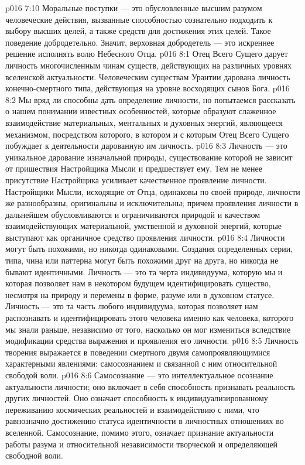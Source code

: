 \vs p016 7:10 Моральные поступки --- это обусловленные высшим разумом человеческие действия, вызванные способностью сознательно подходить к выбору высших целей, а также средств для достижения этих целей. Такое поведение добродетельно. Значит, верховная добродетель --- это искреннее решение исполнять волю Небесного Отца.
\vs p016 8:1 Отец Всего Сущего дарует личность многочисленным чинам существ, действующих на различных уровнях вселенской актуальности. Человеческим существам Урантии дарована личность конечно\hyp{}смертного типа, действующая на уровне восходящих сынов Бога.
\vs p016 8:2 Мы вряд ли способны дать определение личности, но попытаемся рассказать о нашем понимании известных особенностей, которые образуют слаженное взаимодействие материальных, ментальных и духовных энергий, являющееся механизмом, посредством которого, в котором и с которым Отец Всего Сущего побуждает к деятельности дарованную им личность.
\vs p016 8:3 Личность --- это уникальное дарование изначальной природы, существование которой не зависит от пришествия Настройщика Мысли и предшествует ему. Тем не менее присутствие Настройщика усиливает качественное проявление личности. Настройщики Мысли, исходящие от Отца, одинаковы по своей природе, личности же разнообразны, оригинальны и исключительны; причем проявления личности в дальнейшем обусловливаются и ограничиваются природой и качеством взаимодействующих материальной, умственной и духовной энергий, которые выступают как органичное средство проявления личности.
\vs p016 8:4 Личности могут быть похожими, но никогда одинаковыми. Создания определенных серии, типа, чина или паттерна могут быть похожими друг на друга, но никогда не бывают идентичными. Личность --- это та черта индивидуума, которую мы  и которая позволяет нам в некотором будущем идентифицировать существо, несмотря на природу и перемены в форме, разуме или в духовном статусе. Личность --- это та часть любого индивидуума, которая позволяет нам распознавать и идентифицировать этого человека именно как человека, которого мы знали раньше, независимо от того, насколько он мог измениться вследствие модификации средства выражения и проявления его личности.
\vs p016 8:5 \pc Личность творения выражается в поведении смертного двумя самопроявляющимися характерными явлениями: самосознанием и связанной с ним относительной свободой воли.
\vs p016 8:6 Самосознание --- это интеллектуальное осознание актуальности личности; оно включает в себя способность признавать реальность других личностей. Оно означает способность к индивидуализированному переживанию космических реальностей и взаимодействию с ними, что равнозначно достижению статуса идентичности в личностных отношениях во вселенной. Самосознание, помимо этого, означает признание актуальности работы разума и относительной независимости творческой и определяющей свободной воли.
